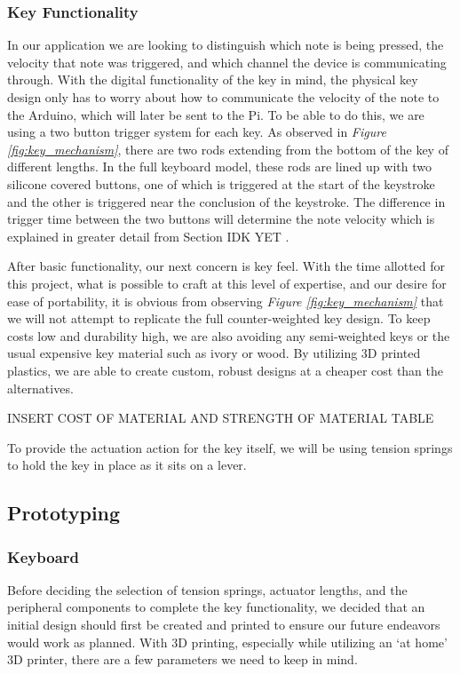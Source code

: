\subsubsection{Key Functionality}

In our application we are looking to distinguish which note is being pressed, the velocity that note was triggered, and which channel the device is communicating through. With the digital functionality of the key in mind, the physical key design only has to worry about how to communicate the velocity of the note to the Arduino, which will later be sent to the Pi. To be able to do this, we are using a two button trigger system for each key. As observed in \textit{Figure \ref{fig:key_mechanism}}, there are two rods extending from the bottom of the key of different lengths. In the full keyboard model, these rods are lined up with two silicone covered buttons, one of which is triggered at the start of the keystroke and the other is triggered near the conclusion of the keystroke. The difference in trigger time between the two buttons will determine the note velocity which is explained in greater detail from Section IDK YET .

After basic functionality, our next concern is key feel. With the time allotted for this project, what is possible to craft at this level of expertise, and our desire for ease of portability, it is obvious from observing \textit{Figure \ref{fig:key_mechanism}} that we will not attempt to replicate the full counter-weighted key design. To keep costs low and durability high, we are also avoiding any semi-weighted keys or the usual expensive key material such as ivory or wood. By utilizing 3D printed plastics, we are able to create custom, robust designs at a cheaper cost than the alternatives.

INSERT COST OF MATERIAL AND STRENGTH OF MATERIAL TABLE

To provide the actuation action for the key itself, we will be using tension springs to hold the key in place as it sits on a lever.

\subsection{Prototyping}

\subsubsection{Keyboard}

Before deciding the selection of tension springs, actuator lengths, and the peripheral components to complete the key functionality, we decided that an initial design should first be created and printed to ensure our future endeavors would work as planned. With 3D printing, especially while utilizing an ‘at home’ 3D printer, there are a few parameters we need to keep in mind.

